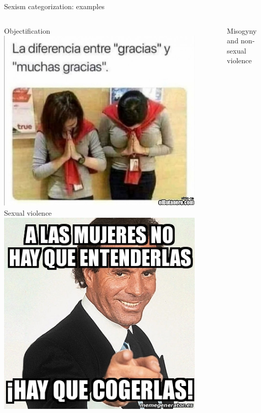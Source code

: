 \begin{frame}{Sexism categorization: examples}
\begin{columns}
\begin{column}{0.33\textwidth}
        \centering
        Objectification
        \includegraphics[width=0.9\textwidth]{images/Objectification.jpeg}
        \vfill
        Sexual violence
        \includegraphics[width=0.9\textwidth]{images/sexual-violence.jpeg}
    \end{column}
    \begin{column}{0.33\textwidth}
        \centering
        Misogyny and non-sexual violence

\end{column}
\end{columns}
\end{frame}
